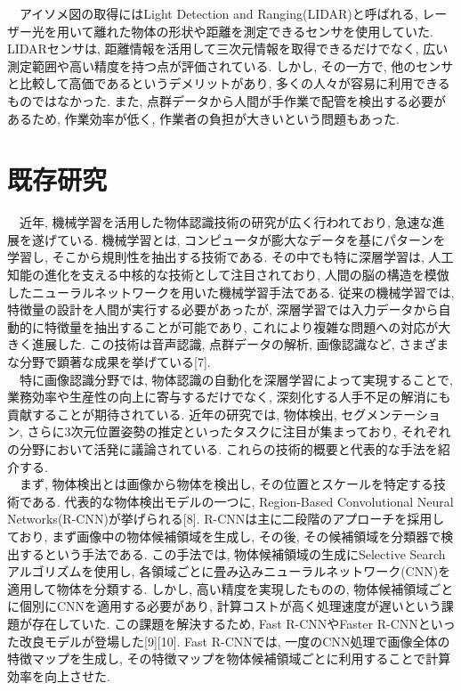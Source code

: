 　アイソメ図の取得にはLight Detection and Ranging(LIDAR)と呼ばれる, レーザー光を用いて離れた物体の形状や距離を測定できるセンサを使用していた. 
LIDARセンサは, 距離情報を活用して三次元情報を取得できるだけでなく, 広い測定範囲や高い精度を持つ点が評価されている. 
しかし, その一方で, 他のセンサと比較して高価であるというデメリットがあり, 多くの人々が容易に利用できるものではなかった. 
また, 点群データから人間が手作業で配管を検出する必要があるため, 作業効率が低く, 作業者の負担が大きいという問題もあった. \\

\section{既存研究}
　近年, 機械学習を活用した物体認識技術の研究が広く行われており, 急速な進展を遂げている. 
機械学習とは, コンピュータが膨大なデータを基にパターンを学習し, そこから規則性を抽出する技術である. 
その中でも特に深層学習は, 人工知能の進化を支える中核的な技術として注目されており, 人間の脳の構造を模倣したニューラルネットワークを用いた機械学習手法である. 
従来の機械学習では, 特徴量の設計を人間が実行する必要があったが, 深層学習では入力データから自動的に特徴量を抽出することが可能であり, これにより複雑な問題への対応が大きく進展した. 
この技術は音声認識, 点群データの解析, 画像認識など, さまざまな分野で顕著な成果を挙げている[7]. \\
　特に画像認識分野では, 物体認識の自動化を深層学習によって実現することで, 業務効率や生産性の向上に寄与するだけでなく, 深刻化する人手不足の解消にも貢献することが期待されている. 
近年の研究では, 物体検出, セグメンテーション, さらに3次元位置姿勢の推定といったタスクに注目が集まっており, それぞれの分野において活発に議論されている. 
これらの技術的概要と代表的な手法を紹介する. \\
　まず, 物体検出とは画像から物体を検出し, その位置とスケールを特定する技術である. 
代表的な物体検出モデルの一つに, Region-Based Convolutional Neural Networks(R-CNN)が挙げられる[8]. 
R-CNNは主に二段階のアプローチを採用しており, まず画像中の物体候補領域を生成し, その後, その候補領域を分類器で検出するという手法である. 
この手法では, 物体候補領域の生成にSelective Searchアルゴリズムを使用し, 各領域ごとに畳み込みニューラルネットワーク(CNN)を適用して物体を分類する. 
しかし, 高い精度を実現したものの, 物体候補領域ごとに個別にCNNを適用する必要があり, 計算コストが高く処理速度が遅いという課題が存在していた. 
この課題を解決するため, Fast R-CNNやFaster R-CNNといった改良モデルが登場した[9][10]. 
Fast R-CNNでは, 一度のCNN処理で画像全体の特徴マップを生成し, その特徴マップを物体候補領域ごとに利用することで計算効率を向上させた. 
